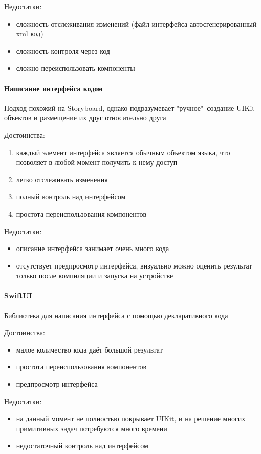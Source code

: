       \noindent Недостатки:
      \begin{itemize}
        \item сложность отслеживания изменений (файл интерфейса автосгенерированный xml код)
        \item сложность контроля через код
        \item сложно переиспользовать компоненты
      \end{itemize}



    \paragraph{Написание интерфейса кодом}
      Подход похожий на Storyboard, однако подразумевает "ручное"\ создание UIKit объектов и размещение их друг относительно друга

      \noindent Достоинства:
      \begin{enumerate}
        \item каждый элемент интерфейса является обычным объектом языка, что позволяет в любой момент получить к нему доступ
        \item легко отслеживать изменения
        \item полный контроль над интерфейсом
        \item простота переиспользования компонентов
      \end{enumerate}

      \noindent Недостатки:
      \begin{itemize}
        \item описание интерфейса занимает очень много кода
        \item отсутствует предпросмотр интерфейса, визуально можно оценить результат только после компиляции и запуска на устройстве
      \end{itemize}


    \paragraph{SwiftUI}
      Библиотека для написания интерфейса с помощью декларативного кода

      \noindent Достоинства:
      \begin{itemize}
        \item малое количество кода даёт большой результат
        \item простота переиспользования компонентов
        \item предпросмотр интерфейса
      \end{itemize}
      \noindent Недостатки:
      \begin{itemize}
        \item на данный момент не полностью покрывает UIKit, и на решение многих примитивных задач потребуются много времени
        \item недостаточный контроль над интерфейсом
      \end{itemize}


